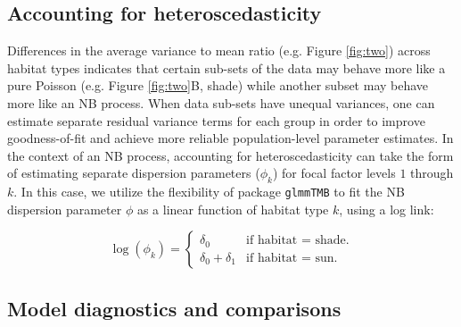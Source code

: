 \documentclass[11pt, oneside]{amsart}
\newcommand{\lib}[1]{\texttt{#1}}
\begin{document}
\subsection{Accounting for heteroscedasticity}

Differences in the average variance to mean ratio (e.g. Figure \ref{fig:two}) across habitat types indicates that certain sub-sets of the data may behave more like a pure Poisson (e.g. Figure \ref{fig:two}B, shade) while another subset may behave more like an NB process. When data sub-sets have unequal variances, one can estimate separate residual variance terms for each group in order to improve goodness-of-fit and achieve more reliable population-level parameter estimates. In the context of an NB process, accounting for heteroscedasticity can take the form of estimating separate dispersion parameters ($\phi_{k}$) for focal factor levels $1$ through $k$. In this case, we utilize the flexibility of package \lib{glmmTMB} to fit the NB dispersion parameter $\phi$ as a linear function of habitat type $k$, using a log link:

\begin{equation}
  \log (\phi_{k}) = \begin{cases}
    \delta_0 & \text{if habitat = shade}.\\
    \delta_0 + \delta_1 & \text{if habitat = sun}.
  \end{cases}
\end{equation}

\subsection{Model diagnostics and comparisons}
\end{document}
